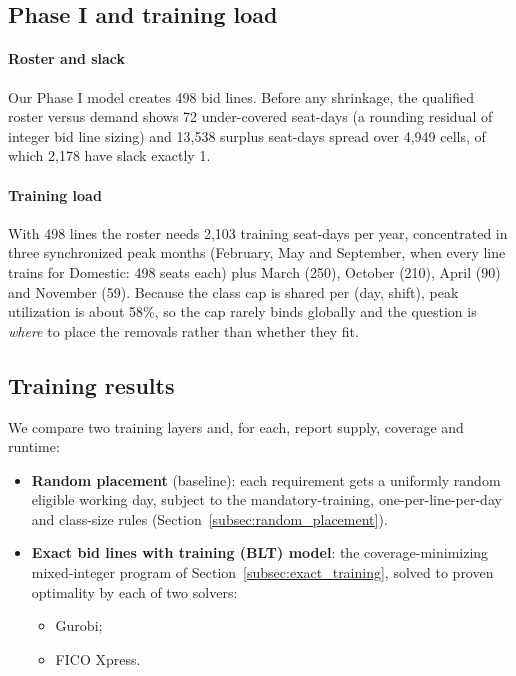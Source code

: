 \documentclass[preprint,12pt]{elsarticle}
\begin{document}
   \subsection{Phase I and training load}
      \paragraph{Roster and slack} Our Phase I model creates 498 bid lines. Before any shrinkage, the qualified roster versus demand shows 72 under-covered seat-days (a rounding residual of integer bid line sizing) and 13,538 surplus seat-days spread over 4,949 cells, of which 2,178 have slack exactly 1. 

      \paragraph{Training load} With 498 lines the roster needs 2,103 training seat-days per year, concentrated in three synchronized peak months (February, May and September, when every line trains for Domestic: 498 seats each) plus March (250), October (210), April (90) and November (59). Because the class cap is shared per (day, shift), peak utilization is about 58\%, so the cap rarely binds globally and the question is \emph{where} to place the removals rather than whether they fit.

   \subsection{Training results}
   We compare two training layers and, for each, report supply, coverage and runtime:
   \begin{itemize}
      \item \textbf{Random placement} (baseline): each requirement gets a uniformly random eligible working day, subject to the mandatory-training, one-per-line-per-day and class-size rules (Section~\ref{subsec:random_placement}).
      \item \textbf{Exact bid lines with training (BLT) model}: the coverage-minimizing mixed-integer program of Section~\ref{subsec:exact_training}, solved to proven optimality by each of two solvers:
      \begin{itemize}
         \item Gurobi;
         \item FICO Xpress.
      \end{itemize}
   \end{itemize}
\end{document}
